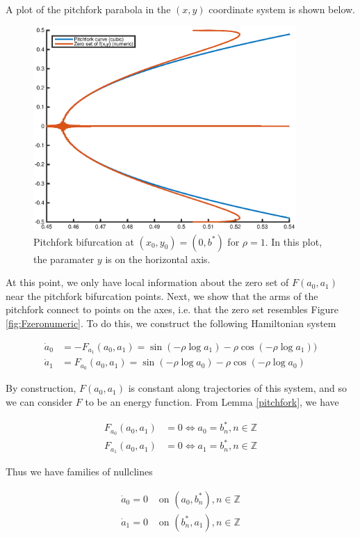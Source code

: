 \documentclass[12pt]{article}
\def\Z{{\mathbb Z}}
\begin{document}
A plot of the pitchfork parabola in the $(x,y)$ coordinate system is shown below.

\begin{figure}[H]
\includegraphics[width=10cm]{pitchfork.eps}
\caption{Pitchfork bifurcation at $(x_0, y_0) = (0, b^*)$ for $\rho = 1$. In this plot, the paramater $y$ is on the horizontal axis.}
\end{figure}

At this point, we only have local information about the zero set of $F(a_0, a_1)$ near the pitchfork bifurcation points. Next, we show that the arms of the pitchfork connect to points on the axes, i.e. that the zero set resembles Figure \ref{fig:Fzeronumeric}. To do this, we construct the following Hamiltonian system

\begin{align}
\dot a_0 &= -F_{a_1}(a_0, a_1) = \sin(-\rho \log a_1) 
- \rho \cos( -\rho \log a_1 )) \\
\dot a_1 &= F_{a_0}(a_0, a_1) = \sin(-\rho \log a_0) 
-\rho \cos( -\rho \log a_0 )
\end{align}

By construction, $F(a_0, a_1)$ is constant along trajectories of this system, and so we can consider $F$ to be an energy function. From Lemma \ref{pitchfork}, we have

\begin{align*}
F_{a_0}(a_0, a_1) &= 0 \iff a_0 = b^*_n, n \in \Z \\
F_{a_1}(a_0, a_1) &= 0 \iff a_1 = b^*_n, n \in \Z
\end{align*}

Thus we have families of nullclines

\begin{align*}
\dot a_0 = 0 &\text{ on } (a_0, b^*_n), n \in \Z \\
\dot a_1 = 0 &\text{ on } (b^*_n, a_1), n \in \Z
\end{align*}
\end{document}
